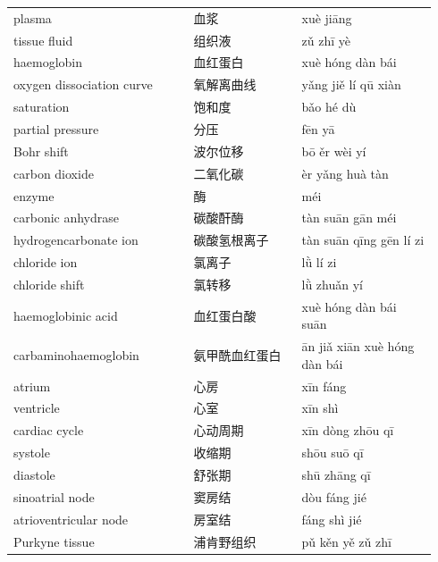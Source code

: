 \documentclass[11pt]{article}
\begin{document}
\begin{longtable}{@{}p{0.40\linewidth}p{0.24\linewidth}p{0.30\linewidth}@{}}
plasma & 血浆 & xuè jiāng \\
tissue fluid & 组织液 & zǔ zhī yè \\
haemoglobin & 血红蛋白 & xuè hóng dàn bái \\
oxygen dissociation curve & 氧解离曲线 & yǎng jiě lí qū xiàn \\
saturation & 饱和度 & bǎo hé dù \\
partial pressure & 分压 & fēn yā \\
Bohr shift & 波尔位移 & bō ěr wèi yí \\
carbon dioxide & 二氧化碳 & èr yǎng huà tàn \\
enzyme & 酶 & méi \\
carbonic anhydrase & 碳酸酐酶 & tàn suān gān méi \\
hydrogencarbonate ion & 碳酸氢根离子 & tàn suān qīng gēn lí zi \\
chloride ion & 氯离子 & lǜ lí zi \\
chloride shift & 氯转移 & lǜ zhuǎn yí \\
haemoglobinic acid & 血红蛋白酸 & xuè hóng dàn bái suān \\
carbaminohaemoglobin & 氨甲酰血红蛋白 & ān jiǎ xiān xuè hóng dàn bái \\
atrium & 心房 & xīn fáng \\
ventricle & 心室 & xīn shì \\
cardiac cycle & 心动周期 & xīn dòng zhōu qī \\
systole & 收缩期 & shōu suō qī \\
diastole & 舒张期 & shū zhāng qī \\
sinoatrial node & 窦房结 & dòu fáng jié \\
atrioventricular node & 房室结 & fáng shì jié \\
Purkyne tissue & 浦肯野组织 & pǔ kěn yě zǔ zhī \\
\end{longtable}
\end{document}
